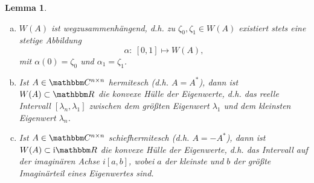 \documentclass[12pt,a4paper]{book}
\theoremstyle{break}
\newtheorem{lemma}[theorem]{Lemma}
\theoremstyle{nonumberplain}
\newcommand{\C}{\mathbbm C}
\newcommand{\R}{\mathbbm R}
\newcommand{\1}{\mathbbm{1}} 			      	%
\newcommand{\im}{\ensuremath{\mathrm{i}}} 			      	%
\begin{document}
\begin{lemma}\label{lemma:eigW}
\begin{enumerate}[(a)]
\item $W(A)$ ist \emph{wegzusammenhängend},
d.h. zu $\zeta_0, \zeta_1\in W(A)$ existiert stets eine stetige Abbildung
\[
\alpha:\ [0,1]\mapsto W(A),
\]
mit $\alpha(0)=\zeta_0$ und $\alpha_1=\zeta_1$.
\item Ist $A\in \C^{n\times n}$ \emph{hermitesch} (d.h. $A=A^*$), dann ist $W(A)\subset \R$ die konvexe Hülle der
Eigenwerte, d.h. das reelle Intervall $[\lambda_n,\lambda_1]$ zwischen dem größten Eigenwert $\lambda_1$ und dem kleinsten Eigenwert $\lambda_n$. 
\item Ist $A\in \C^{n\times n}$ \emph{schiefhermitesch} (d.h. $A=-A^*$), dann ist $W(A) \subset \im \R$ die konvexe Hülle der
Eigenwerte, d.h. das Intervall auf der imaginären Achse $i[a,b]$, wobei $a$ der kleinste und $b$ der größte Imaginärteil eines Eigenwertes sind.
\end{enumerate}
\end{lemma}
\end{document}
